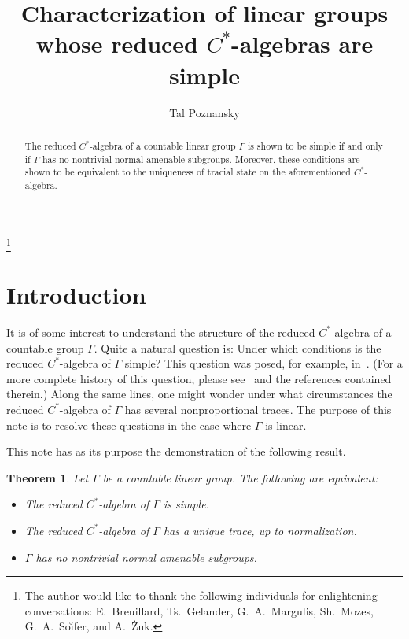 \documentclass{amsart}
\author{Tal Poznansky}
\title[Linear groups with simple reduced $C^{*}$-algebras]{Characterization of linear groups whose reduced $C^{*}$-algebras are simple}
\theoremstyle{plain}
\newtheorem{theorem}{Theorem}[section]
\theoremstyle{definition}
\theoremstyle{remark}
\begin{document}
\address{Centro di Ricerca Matematica ``Ennio De Giorgi''\\
Scuola Normale Superiore\\
56126 Pisa\\
Italia}
\thanks{The author would like to thank the following
individuals for enlightening conversations: E.~Breuillard, Ts.~Gelander, G.~A.~Margulis,
Sh.~Mozes, G.~A.~So{\u\i}fer, and A.~{\.Z}uk.}
\begin{abstract}
The reduced $C^{*}$-algebra of a countable linear group $\Gamma$ is shown to be simple
if and only if $\Gamma$ has no nontrivial normal amenable subgroups. Moreover, these
conditions are shown to be equivalent to the uniqueness of tracial state on the
aforementioned $C^{*}$-algebra.
\end{abstract}
\maketitle
\tableofcontents
\section{Introduction}
It is of some interest to understand the structure of the reduced $C^{*}$-algebra of a
countable group $\Gamma$. Quite a natural question is: Under which
conditions is the reduced $C^{*}$-algebra of $\Gamma$ simple? This question was
posed, for example, in~\cite{MR87b:22007}. (For a more complete history of this
question, please see~\cite{1123.22004} and the references contained therein.)
Along the same lines, one
might wonder under what circumstances the reduced $C^{*}$-algebra of $\Gamma$ has several
nonproportional traces. The purpose of this note is to resolve these questions in the
case where $\Gamma$ is linear.

This note has as its purpose the demonstration of the following result.
\begin{theorem}\label{thm:main}
Let $\Gamma$ be a countable linear group. The following are equivalent:
\begin{itemize}
\item[(i)] The reduced $C^{*}$-algebra of $\Gamma$ is simple.
\item[(ii)] The reduced $C^{*}$-algebra of $\Gamma$ has a unique trace, up to
normalization.
\item[(iii)] $\Gamma$ has no nontrivial normal amenable subgroups.
\end{itemize}
\end{theorem}
\end{document}
